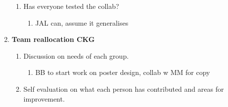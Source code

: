 \begin{enumerate}
\begin{enumerate}
\item  Has everyone tested the collab?

\begin{enumerate}
\item  JAL can, assume it generalises\\
\end{enumerate}
\end{enumerate}

\item  \textbf{Team reallocation CKG}

\begin{enumerate}
\item Discussion on needs of each group.

\begin{enumerate}
\item  BB to start work on poster design, collab w MM for copy
\end{enumerate}

\item  Self evaluation on what each person has contributed and areas for improvement.
\end{enumerate}
\end{enumerate}



